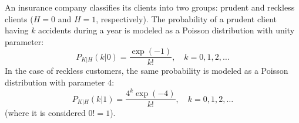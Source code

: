  \begin{solution}
\end{solution}


\else


An insurance company classifies its clients into two groups: prudent and reckless clients ($H=0$ and $H =1$, respectively). The probability of a prudent client having $k$ accidents during a year is modeled as a Poisson distribution with unity parameter:
$$P_{K|H}(k|0)=\frac{\exp(-1)}{k !}, \quad k=0,1,2,\ldots$$
In the case of reckless customers, the same probability is modeled as a Poisson distribution with parameter $4$:
$$P_{K|H}(k|1)=\frac{4^k\exp(-4)}{k !}, \quad k=0,1,2,\ldots$$
(where it is considered $0! = 1$).

